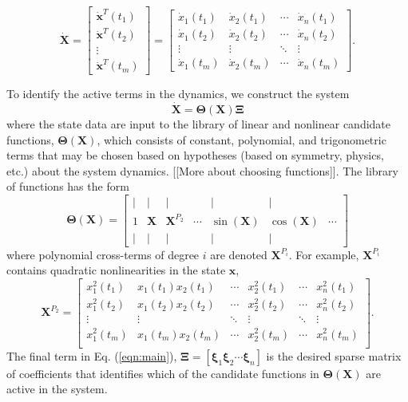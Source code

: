 \documentclass[12pt,preprintnumbers,amsmath,amssymb,titlepage]{report}
\newcommand{\refe}[1]{Eq. (\ref{#1})}
\begin{document}
\begin{equation*}
	\bm{\dot{X}} = \begin{bmatrix} 
				\bm{\dot{x}}^T(t_1) \\ \bm{\dot{x}}^T(t_2) \\ \vdots \\ \bm{\dot{x}}^T(t_m)
			\end{bmatrix}
		   = \begin{bmatrix}
		   		\dot{x}_1(t_1) & \dot{x}_2(t_1) & \cdots & \dot{x}_n(t_1) \\
		   		\dot{x}_1(t_2) & \dot{x}_2(t_2) & \cdots & \dot{x}_n(t_2) \\
		   		\vdots    	   & \vdots   		& \ddots & \vdots  \\
		   		\dot{x}_1(t_m) & \dot{x}_2(t_m) & \cdots & \dot{x}_n(t_m)
	   		\end{bmatrix}.
\end{equation*}

To identify the active terms in the dynamics, we construct the system 
\begin{equation} \label{eqn:main}
	\bm{\dot{X}} = \bm{\Theta}(\bm{X})\bm{\Xi}
\end{equation}
where the state data are input to the library of linear and nonlinear candidate functions, $\bm{\Theta}(\bm{X})$, which consists of constant, polynomial, and trigonometric terms that may be chosen based on hypotheses (based on symmetry, physics, etc.) about the system dynamics. [[More about choosing functions]]. The library of functions has the form
\begin{equation}
	\bm{\Theta}(\bm{X}) = 
	\begin{bmatrix}
		\mid & \mid 	& \mid 	 		&        & \mid	  		& \mid 		   &  		\\
		1	 & \bm{X}   & \bm{X}^{P_2}  & \cdots & \sin(\bm{X}) & \cos(\bm{X}) & \cdots \\
		\mid & \mid 	& \mid 	 		&        & \mid	  		& \mid  	   &
	\end{bmatrix}
\end{equation}
where polynomial cross-terms of degree $i$ are denoted $\bm{X}^{P_i}$. For example, $\bm{X}^{P_i}$ contains quadratic nonlinearities in the state $\bm{x}$,
\begin{equation*}
	\bm{X}^{P_2} = 
		\begin{bmatrix}
			x_1^2(t_1)	&	x_1(t_1)x_2(t_1) & \cdots & x_2^2(t_1) & \cdots & x_n^2(t_1) \\
			x_1^2(t_2)	&	x_1(t_2)x_2(t_2) & \cdots & x_2^2(t_2) & \cdots & x_n^2(t_2) \\
			\vdots		&	\vdots		     & \ddots & \vdots	   & \ddots & \vdots	 \\
			x_1^2(t_m)	&	x_1(t_m)x_2(t_m) & \cdots & x_2^2(t_m) & \cdots & x_n^2(t_m) \\
		\end{bmatrix}.
\end{equation*}
The final term in \refe{eqn:main}, $\bm{\Xi} = [\bm{\xi}_1 \bm{\xi}_2 \cdots \bm{\xi}_n]$ is the desired sparse matrix of coefficients that identifies which of the candidate functions in $\bm{\Theta}(\bm{X})$ are active in the system. 
\end{document}
